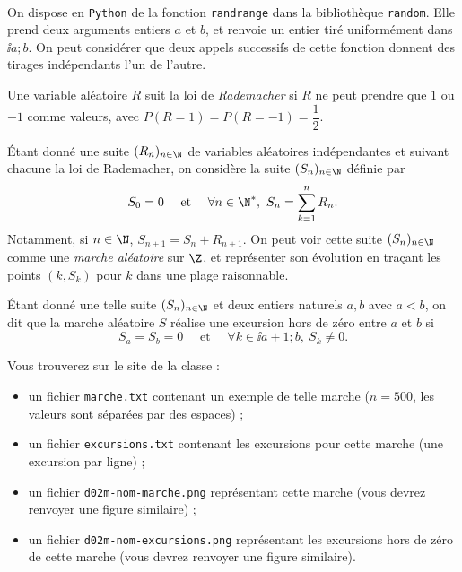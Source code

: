 \exer{[PLT-000]}
\setcounter{numques}{0}~\\

On dispose en \texttt{Python} de la fonction \texttt{randrange} dans la bibliothèque \texttt{random}. 
Elle prend deux  arguments entiers $a$ et $b$, et renvoie un entier tiré uniformément dans $\ii{a;b}$. 
On peut considérer que deux appels successifs de cette fonction donnent des tirages indépendants l'un de l'autre. 

Une variable aléatoire $R$ suit la loi de \emph{Rademacher} si $R$ ne peut prendre que $1$ ou $-1$ comme valeurs, avec $P(R=1)=P(R=-1) = \dfrac{1}{2}$.

Étant donné une suite $(R_n)_{n\in\N}$ de variables aléatoires indépendantes et suivant chacune la loi de Rademacher, on considère la suite $(S_n)_{n\in\N}$ définie par 
\begin{equation*}
  S_0 = 0 \quad\textrm{ et }\quad \forall n \in \N^\ast,~S_{n} = \sum_{k=1}^n R_n.
\end{equation*}
Notamment, si $n\in\N$, $S_{n+1} = S_n + R_{n+1}$. On peut voir cette suite $(S_n)_{n\in\N}$ comme une \emph{marche aléatoire} sur $\Z$, et représenter son évolution en traçant les points $(k,S_k)$ pour $k$ dans une plage raisonnable. 

Étant donné une telle suite  $(S_n)_{n\in\N}$ et deux entiers naturels $a,b$ avec $a<b$, on dit que la marche aléatoire $S$ réalise une excursion hors de zéro entre $a$ et $b$ si 
\begin{equation*}
  S_a = S_b = 0 \quad\textrm{ et }\quad \forall k \in \ii{a+1;b},~ S_k \neq 0.
\end{equation*}

Vous trouverez sur le site de la classe :
\begin{itemize}
  \item un fichier \texttt{marche.txt} contenant un exemple de telle marche ($n=500$, les valeurs sont séparées par des espaces) ;
  \item un fichier \texttt{excursions.txt} contenant les excursions pour cette marche (une excursion par ligne) ; 
  \item un fichier \texttt{d02m-nom-marche.png} représentant cette marche (vous devrez renvoyer une figure similaire) ; 
  \item un fichier \texttt{d02m-nom-excursions.png} représentant les excursions hors de zéro de cette marche (vous devrez renvoyer une figure similaire).
\end{itemize}

